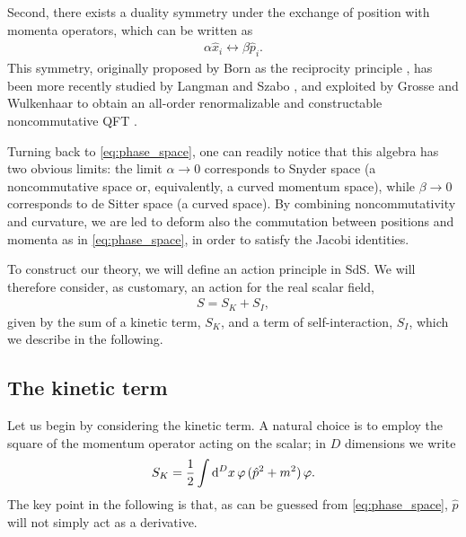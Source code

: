 \documentclass[a4paper,10pt]{amsart}
\begin{document}
Second, there exists a duality symmetry under the exchange of position with momenta operators,
which can be written as
\begin{align}\label{eq:duality}
\alpha\hat x_i \leftrightarrow\beta\hat p_i.
\end{align}
This symmetry, originally proposed by Born as the reciprocity principle \cite{Born:1949}, has been more recently studied by Langman and Szabo \cite{Langmann:2002cc},
and exploited by Grosse and Wulkenhaar to obtain an all-order renormalizable and constructable noncommutative QFT \cite{Grosse:2005da}.

Turning back to \eqref{eq:phase_space}, one can readily notice that this algebra has two obvious limits: the limit $\alpha\to0$ corresponds to Snyder space (a noncommutative space or, equivalently, a curved momentum space), while $\beta\to0$ corresponds to de Sitter space (a curved space). By combining noncommutativity and curvature, we are led to deform also the commutation between positions and momenta as in \eqref{eq:phase_space}, in order to satisfy the Jacobi identities.


To construct our theory, we will define an action principle in SdS.
We will therefore consider, as customary, an action for the real scalar field,
\begin{align}\label{eq.S}
 S=S_K+S_I,
\end{align}
given by the sum of a kinetic term, $S_K$, and a  term of self-interaction, $S_I$,
which we describe in the following.

\subsection{The kinetic term}
Let us begin by considering the kinetic term.
A natural choice is to employ the square of the momentum operator  acting on the scalar;
in $D$ dimensions we write
\begin{align}\label{eq:action}
 S_K=\frac{1}{2}\int {\rm d}^Dx \,\varphi\, (\hat p^2+ m^2)\, \varphi.
\end{align}
The key point in the following is that, as can be guessed from \eqref{eq:phase_space}, $\hat p$ will not simply act as a derivative.
\end{document}
